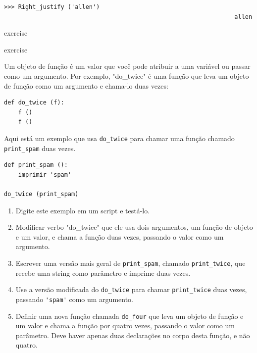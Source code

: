 \documentclass[10pt]{book}
\begin{document}
\begin{exercise}
\begin{}
\begin{verbatim}
>>> Right_justify ('allen')
                                                                 allen
\end{verbatim}

\end{} exercise


\begin{} exercise

Um objeto de função é um valor que você pode atribuir a uma variável
ou passar como um argumento. Por exemplo, \verbo "do_twice" é uma função
que leva um objeto de função como um argumento e chama-lo duas vezes:

\begin{verbatim}
def do_twice (f):
    f ()
    f ()
\end{verbatim}

Aqui está um exemplo que usa \verb "do_twice" para chamar uma função
chamado \verb "print_spam" duas vezes.

\begin{verbatim}
def print_spam ():
    imprimir 'spam'

do_twice (print_spam)
\end{verbatim}

\begin{enumerate}

\item Digite este exemplo em um script e testá-lo.

\item Modificar verbo "do_twice" \para que ele usa dois argumentos, um
função de objeto e um valor, e chama a função duas vezes,
passando o valor como um argumento.

\item Escrever uma versão mais geral de \verb "print_spam", chamado
\Verb "print_twice", que recebe uma string como parâmetro e imprime
duas vezes.

\item Use a versão modificada do \verb "do_twice" para chamar
\Verb "print_twice" duas vezes, passando \verb "'spam'" como um argumento.

\item Definir uma nova função chamada 
\Verb "do_four" que leva um objeto de função e um valor
e chama a função por quatro vezes, passando o valor
como um parâmetro. Deve haver apenas
duas declarações no corpo desta função, e não quatro.

\end{enumerate}


\end{}
\end{exercise}
\end{document}
